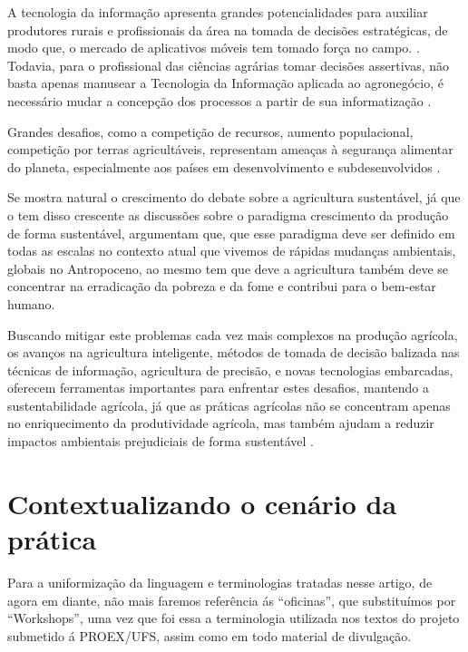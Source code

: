 A tecnologia da informação apresenta grandes potencialidades para auxiliar produtores rurais e profissionais da área na tomada de decisões estratégicas, de modo que, o mercado de aplicativos móveis tem tomado força no campo. . Todavia, para o profissional das ciências agrárias tomar decisões assertivas, não basta apenas manusear a Tecnologia da Informação aplicada ao agronegócio, é   necessário   mudar a concepção dos processos a partir de sua informatização \cite{ferraz_tecnologia_2017,sharma_systematic_2020}. 

Grandes desafios, como a competição de recursos, aumento populacional, competição por terras agricultáveis, representam ameaças à segurança alimentar do planeta, especialmente aos países em desenvolvimento e subdesenvolvidos \cite{pardey_bounds_2014}. 

Se mostra natural o crescimento do debate sobre a agricultura sustentável, já que o tem disso crescente as discussões sobre o paradigma crescimento da produção de forma sustentável, 
 argumentam que, que esse paradigma deve ser definido em todas as escalas no contexto atual que vivemos de rápidas mudanças ambientais, globais no Antropoceno, ao mesmo tem que deve a agricultura também deve se concentrar na erradicação da pobreza e da fome e contribui para o bem-estar humano.

Buscando mitigar este problemas cada vez mais complexos na produção agrícola, os avanços na agricultura inteligente, métodos de tomada de decisão balizada nas técnicas de informação,  agricultura de precisão, e novas tecnologias embarcadas, oferecem ferramentas importantes para enfrentar estes desafios, mantendo a sustentabilidade agrícola, já que as práticas agrícolas não se concentram apenas no enriquecimento da produtividade agrícola, mas também ajudam a reduzir impactos ambientais prejudiciais de forma sustentável \cite{adnan_effects_2018,rockstrom_sustainable_2017,ye_bio-organic_2020}. 


\section{Contextualizando o cenário da prática}

Para a uniformização da linguagem e terminologias tratadas nesse artigo, de agora em diante, não mais faremos referência ás “oficinas”, que substituímos por “Workshops”, uma vez que foi essa a terminologia utilizada nos textos do projeto submetido á PROEX/UFS, assim como em todo material de divulgação. 

